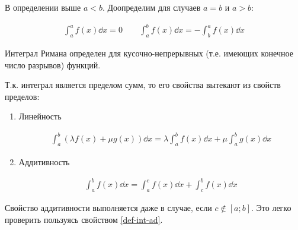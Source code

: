 \begin{remark}\label{def-int-ad}
  В определении выше \(a < b\). Доопределим для случаев \(a = b\) и \(a > b\):

  \begin{align*}
    \int_{a}^{a} f(x) \dd x = 0 \qquad
    \int_{a}^{b} f(x) \dd x = -\int_{b}^{a} f(x) \dd x
  \end{align*}
\end{remark}

\begin{remark}
  Интеграл Римана определен для кусочно-непрерывных (т.е. имеющих конечное
  число разрывов) функций.
\end{remark}

Т.к. интеграл является пределом сумм, то его свойства вытекают из свойств
пределов:
\begin{enumerate}
  \item Линейность
  
  \begin{align*}
    \int_{a}^{b} (\lambda f(x) + \mu g(x)) \dd x =
    \lambda \int_{a}^{b} f(x) \dd x + \mu \int_{a}^{b} g(x) \dd x
  \end{align*}

  \item Аддитивность
  
  \begin{align*}
    \int_{a}^{b} f(x) \dd x =
    \int_{a}^{c} f(x) \dd x + \int_{c}^{b} f(x) \dd x
  \end{align*}
\end{enumerate}

\begin{remark}
  Свойство аддитивности выполняется даже в случае, если \(c \notin [a;b]\). Это
  легко проверить пользуясь свойством \ref{def-int-ad}.
\end{remark}
